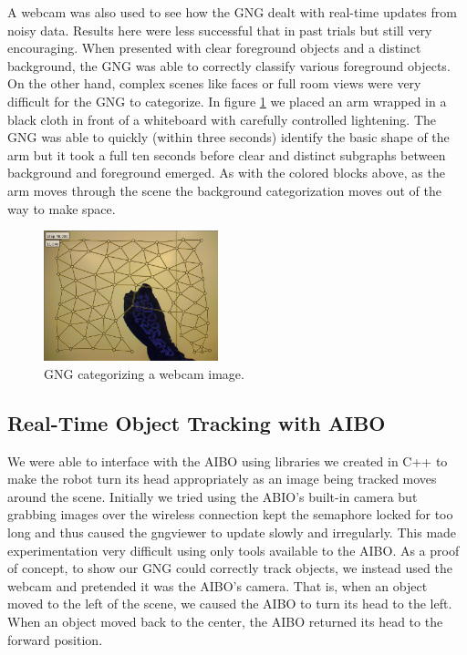\documentclass{article}
\renewcommand{\|}{\origbar} %
\begin{document}
A webcam was also used to see how the GNG dealt with real-time updates from noisy data. Results here were less successful that in past trials but still very encouraging. When presented with clear foreground objects and a distinct background, the GNG was able to correctly classify various foreground objects. On the other hand, complex scenes like faces or full room views were very difficult for the GNG to categorize. In figure \ref{fig:webcam} we placed an arm wrapped in a black cloth in front of a whiteboard with carefully controlled lightening. The GNG was able to quickly (within three seconds) identify the basic shape of the arm but it took a full ten seconds before clear and distinct subgraphs between background and foreground emerged. As with the colored blocks above, as the arm moves through the scene the background categorization moves out of the way to make space.

\begin{figure}[h!]
  \centering
  
  \includegraphics[width=0.45\textwidth]{webcam.png}
  
  \caption{GNG categorizing a webcam image.}
  \label{fig:webcam}
\end{figure}

\subsection{Real-Time Object Tracking with AIBO}

We were able to interface with the AIBO using libraries we created in C++ to make the robot turn its head appropriately as an image being tracked moves around the scene. Initially we tried using the ABIO's built-in camera but grabbing images over the wireless connection kept the semaphore locked for too long and thus caused the gngviewer to update slowly and irregularly. This made experimentation very difficult using only tools available to the AIBO. As a proof of concept, to show our GNG could correctly track objects, we instead used the webcam and pretended it was the AIBO's camera. That is, when an object moved to the left of the scene, we caused the AIBO to turn its head to the left. When an object moved back to the center, the AIBO returned its head to the forward position.
\end{document}
